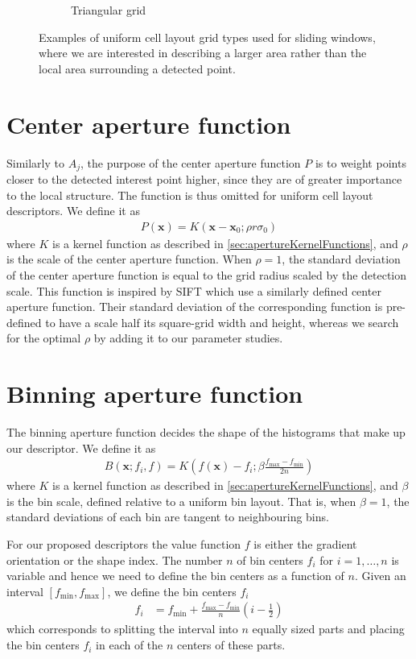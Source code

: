 \documentclass[thesis.tex]{subfiles}
\def\x{\mathbf{x}}
\begin{document}
\begin{figure}[tb]
\begin{subfigure}[t]{0.45\textwidth}
		\caption{Triangular grid}
		\label{fig:gridTypeTriangle}
	\end{subfigure}
	\caption{Examples of uniform cell layout grid types used for sliding windows, where we are interested in describing a larger area rather than the local area surrounding a detected point.}
\label{fig:gridTypeWindow}
\end{figure}
%
\section{Center aperture function}
\label{sec:centerApertureFunction}
%
Similarly to $A_j$, the purpose of the center aperture function $P$ is to weight points closer to the detected interest point higher, since they are of greater importance to the local structure. The function is thus omitted for uniform cell layout descriptors. We define it as
%
\begin{align}
P(\x) = K(\x - \x_0; \rho r \sigma_0)
\end{align}
%
where $K$ is a kernel function as described in \ref{sec:apertureKernelFunctions}, and $\rho$ is the scale of the center aperture function. When $\rho = 1$, the standard deviation of the center aperture function is equal to the grid radius scaled by the detection scale. This function is inspired by SIFT which use a similarly defined center aperture function. Their standard deviation of the corresponding function is pre-defined to have a scale half its square-grid width and height, whereas we search for the optimal $\rho$ by adding it to our parameter studies.
%
\section{Binning aperture function}
\label{sec:binningApertureFunction}
%
The binning aperture function decides the shape of the histograms that make up our descriptor. We define it as
\begin{align}
	B(\x; f_i, f) = K \left( f(\x) - f_i; \beta \frac{f_\text{max} - f_\text{min}}{2n} \right)
\end{align}
where $K$ is a kernel function as described in \ref{sec:apertureKernelFunctions}, and $\beta$ is the bin scale, defined relative to a uniform bin layout. That is, when $\beta = 1$, the standard deviations of each bin are tangent to neighbouring bins.

For our proposed descriptors the value function $f$ is either the gradient orientation or the shape index. The number $n$ of bin centers $f_i$ for $i = 1,\hdots,n$ is variable and hence we need to define the bin centers as a function of $n$. Given an interval $[f_\text{min},f_\text{max}]$, we define the bin centers $f_i$
\begin{align}
	\label{eq:binCenters}
	f_i &= f_\text{min} + \frac{f_\text{max}-f_\text{min}}{n} \left(i - \frac{1}{2} \right)
\end{align}
which corresponds to splitting the interval into $n$ equally sized parts and placing the bin centers $f_i$ in each of the $n$ centers of these parts.
\end{document}
